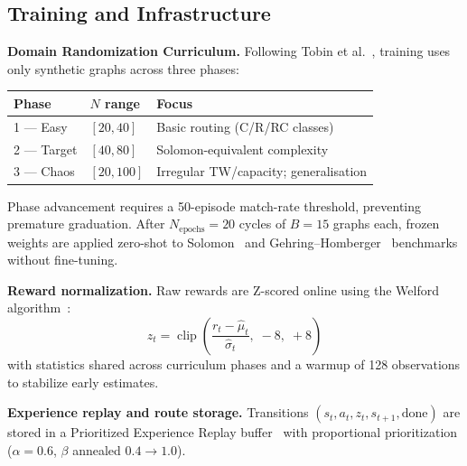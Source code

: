 \documentclass[journal]{IEEEtran}
\begin{document}
\subsection{Training and Infrastructure}
\label{sec:training}

\textbf{Domain Randomization Curriculum.}
Following Tobin et al.~\cite{tobin2017domain}, training uses only synthetic
graphs across three phases:

\begin{center}
\setlength{\tabcolsep}{4pt}
\small
\begin{tabular}{@{}lll@{}}
\toprule
\textbf{Phase} & \textbf{$N$ range} & \textbf{Focus}\\
\midrule
1 --- Easy   & $[20,40]$  & Basic routing (C/R/RC classes)\\
2 --- Target & $[40,80]$  & Solomon-equivalent complexity~\cite{Solomon1987}\\
3 --- Chaos  & $[20,100]$ & Irregular TW/capacity; generalisation\\
\bottomrule
\end{tabular}
\end{center}

Phase advancement requires a 50-episode match-rate threshold, preventing
premature graduation.  After $N_{\text{epochs}}{=}20$ cycles of $B{=}15$
graphs each, frozen weights are applied zero-shot to
Solomon~\cite{Solomon1987} and Gehring--Homberger~\cite{Gehring1999}
benchmarks without fine-tuning.

\textbf{Reward normalization.}
Raw rewards are Z-scored online using the Welford
algorithm~\cite{welford1962}:
\begin{equation}
  z_t = \operatorname{clip}\!\left(\frac{r_t - \hat\mu_t}{\hat\sigma_t},\;
    -8,\;+8\right)
  \label{eq:welford}
\end{equation}
with statistics shared across curriculum phases and a warmup of 128
observations to stabilize early estimates.

\textbf{Experience replay and route storage.}
Transitions $(s_t,a_t,z_t,s_{t+1},\text{done})$ are stored in a Prioritized
Experience Replay buffer~\cite{schaul2016prioritized} with proportional
prioritization ($\alpha{=}0.6$, $\beta$ annealed $0.4{\to}1.0$).
\end{document}

